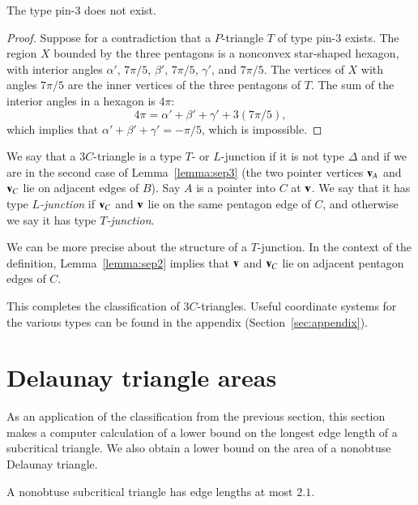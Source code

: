 \begin{lemma}  The type pin-$3$ does not exist.  
\end{lemma}

\begin{proof} Suppose for a contradiction that a $P$-triangle $T$ of
  type pin-$3$ exists.  The region $X$ bounded by the three pentagons
  is a nonconvex star-shaped hexagon, with interior angles $\alpha'$,
  $7\pi/5$, $\beta'$, $7\pi/5$, $\gamma'$, and $7\pi/5$.  The vertices
  of $X$ with angles $7\pi/5$ are the inner vertices of the three
  pentagons of $T$.  The sum of the interior angles in a hexagon is $4\pi$:
\[
4\pi = \alpha'+\beta'+\gamma' + 3 (7\pi/5),
\]
which implies that $\alpha'+\beta'+\gamma' = -\pi/5$, which is
impossible.
\end{proof}

\begin{definition}
  We say that a $3C$-triangle is a type $T$- or $L$-junction if it is
  not type $\Delta$ and if we are in the second case of
  Lemma~\ref{lemma:sep3} (the two pointer vertices ${\mathbf v}_A$ and ${\mathbf v}_C$
  lie on adjacent edges of $B$).  Say $A$ is a pointer into $C$ at
  ${\mathbf v}$.  We say that it has type {\it $L$-junction} if ${\mathbf v}_C$ and ${\mathbf v}$
  lie on the same pentagon edge of $C$, and otherwise we say it has
  type {\it $T$-junction}.
\end{definition}

We can be more precise about the structure of a $T$-junction.  In the
context of the definition, Lemma~\ref{lemma:sep2} implies that ${\mathbf v}$
and ${\mathbf v}_C$ lie on adjacent pentagon edges of $C$.

This completes the classification of $3C$-triangles.  Useful
coordinate systems for the various types can be found in the appendix
(Section~\ref{sec:appendix}).

\section{Delaunay triangle areas}

As an application of the classification from the previous section,
this section makes a computer calculation of a lower bound on the
longest edge length of a subcritical triangle.  We also obtain a lower
bound on the area of a nonobtuse Delaunay triangle.



\begin{lemma}\label{lemma:21} A nonobtuse subcritical triangle has edge lengths
  at most $2.1$.
\end{lemma}

